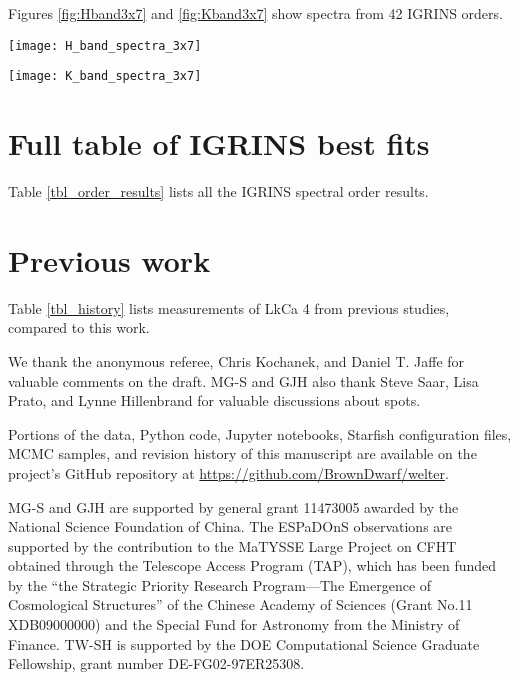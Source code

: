 \documentclass[twocolumn]{emulateapj}%
\newcommand{\name}{LkCa 4 }
\begin{document}
Figures \ref{fig:Hband3x7} and \ref{fig:Kband3x7} show spectra from 42 IGRINS orders.


\begin{figure*}
 \centering
 \texttt{[image: H\_band\_spectra\_3x7]}
 \caption{IGRINS Orders $122-100$, with panels arranged with the shortest wavelength in the upper left corner with central wavelength decreasing toward the bottom of the leftmost column, then decreasing through the subsequent columns.  The $y-$axis is on a logarithmic scale.  The red line is the cool photosphere while the blue line is the hot photosphere.  The purple line is the composite mixture model.}
 \label{fig:Hband3x7}
\end{figure*}

\begin{figure*}
 \centering
 \texttt{[image: K\_band\_spectra\_3x7]}
 \caption{IGRINS Orders $93-73$, with the same layout, ordering, and colors as Figure \ref{fig:Hband3x7}. The $y-$axis is on a logarithmic scale.}
 \label{fig:Kband3x7}
\end{figure*}



\section{Full table of IGRINS best fits}

Table \ref{tbl_order_results} lists all the IGRINS spectral order results.
\LongTables


\section{Previous work}

Table \ref{tbl_history} lists measurements of \name from previous studies, compared to this work.



\acknowledgements

We thank the anonymous referee, Chris Kochanek, and Daniel T. Jaffe for valuable comments on the draft.  MG-S and GJH also thank Steve Saar, Lisa Prato, and Lynne Hillenbrand for valuable discussions about spots.

Portions of the data, Python code, Jupyter notebooks, Starfish configuration files, MCMC samples, and revision history of this manuscript are available on the project's GitHub repository at \url{https://github.com/BrownDwarf/welter}.

MG-S and GJH are supported by general grant 11473005 awarded by the National Science Foundation of China.   The ESPaDOnS observations are supported by the contribution to the MaTYSSE Large Project on CFHT obtained through the Telescope Access Program (TAP), which has been funded by the ``the Strategic Priority Research Program---The Emergence of Cosmological Structures'' of the Chinese Academy of Sciences (Grant No.11 XDB09000000) and the Special Fund for Astronomy from the Ministry of Finance. 
TW-SH is supported by the DOE Computational Science Graduate Fellowship, grant number DE-FG02-97ER25308.
\end{document}
